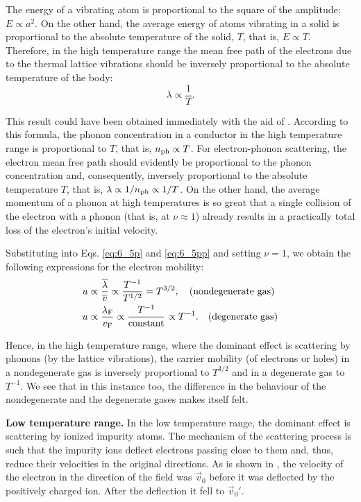 The energy of a vibrating atom is proportional to the square of the amplitude: $E\propto a^2$. On the other hand, the average energy of atoms vibrating in a solid is proportional to the absolute temperature of the solid, $T$, that is, $E\propto T$. Therefore, in the high temperature range the mean free path of the electrons due to the thermal lattice vibrations should be inversely proportional to the absolute temperature of the body:
\begin{equation}\label{eq:6_18}
    \lambda \propto \frac{1}{T}.
\end{equation}

This result could have been obtained immediately with the aid of . According to this formula, the phonon concentration in a conductor in the high temperature range is proportional to $T$, that is, $n_{\text{ph}}\propto T$. For electron-phonon scattering, the electron mean free path should evidently be proportional to the phonon concentration and, consequently, inversely proportional to the absolute temperature $T$, that is, $\lambda\propto 1/n_{\text{ph}}\propto 1/T$. On the other hand, the average momentum of a phonon at high temperatures is so great that a single collision of the electron with a phonon (that is, at $\nu\approx 1$) already results in a practically total loss of the electron's initial velocity.

Substituting  into Eqs. \eqref{eq:6_5p} and \eqref{eq:6_5pp} and setting $\nu=1$, we obtain the following expressions for the electron mobility:
\begin{align}
    u &\propto \frac{\overline{\lambda}}{\overline{v}} \propto \frac{T^{-1}}{T^{1/2}} = T^{3/2},\quad \text{(nondegenerate gas)} \label{eq:6_19}\\
    u &\propto \frac{\lambda_{\text{F}}}{v_{\text{F}}} \propto \frac{T^{-1}}{\text{constant}} \propto T^{-1}. \quad \text{(degenerate gas)}\label{eq:6_20}
\end{align}

Hence, in the high temperature range, where the dominant effect is scattering by phonons (by the lattice vibrations), the carrier mobility (of electrons or holes) in a nondegenerate gas is inversely proportional to $T^{3/2}$ and in a degenerate gas to $T^{-1}$. We see that in this instance too, the difference in the behaviour of the nondegenerate and the degenerate gases makes itself felt.

\textbf{Low temperature range.} In the low temperature range, the dominant effect is scattering by ionized impurity atoms. The mechanism of the scattering process is such that the impurity ions deflect electrons passing close to them and, thus, reduce their velocities in the original directions. As is shown in , the velocity of the electron in the direction of the field was $\vec{v}_0$ before it was deflected by the positively charged ion. After the deflection it fell to $\vec{v}_0'$.

